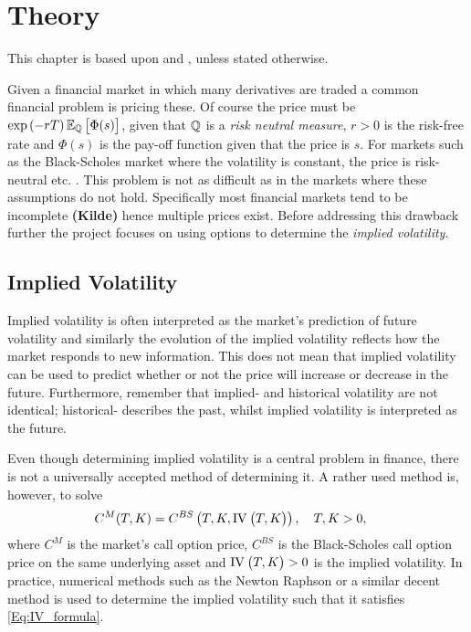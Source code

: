 \chapter{Theory}\label{Ch.2}
This chapter is based upon \citep{Hull} and \citep{Cal}, unless stated otherwise.

Given a financial market in which many derivatives are traded a common financial problem is pricing these. Of course the price must be $\exp\left(-rT\right)\E[\Q]{\Phi(s)}$, given that $\mathbb{Q}$ is a \emph{risk neutral measure}, $r>0$ is the risk-free rate and $\Phi(s)$ is the pay-off function given that the price is $s$. For markets such as the Black-Scholes market where the volatility is constant, the price is risk-neutral etc. \citep{BS}. This problem is not as difficult as in the markets where these assumptions do not hold. Specifically most financial markets tend to be incomplete \textbf{(Kilde)} hence multiple prices exist. Before addressing this drawback further the project focuses on using options to determine the \emph{implied volatility}.


\section{Implied Volatility}\label{Sec.Implied_Volatility}
Implied volatility is often interpreted as the market's prediction of future volatility and similarly the evolution of the implied volatility reflects how the market responds to new information. This does not mean that implied volatility can be used to predict whether or not the price will increase or decrease in the future. Furthermore, remember that implied- and historical volatility are not identical; historical- describes the past, whilst implied volatility is interpreted as the future.

Even though determining implied volatility is a central problem in finance, there is not a universally accepted method of determining it. A rather used method is, however, to solve
\begin{align}\label{Eq:IV_formula}
    C^{M}(T,K) &= C^{BS}\left(T,K,\IV{T,K}\right),\quad T,K>0,
\end{align}
where $C^{M}$ is the market's call option price, $C^{BS}$ is the Black-Scholes call option price on the same underlying asset and $\IV{T,K}>0$ is the implied volatility. In practice, numerical methods such as the Newton Raphson or a similar decent method is used to determine the implied volatility such that it satisfies \eqref{Eq:IV_formula}.


